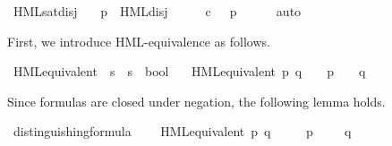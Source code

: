 \begin{isabellebody}
%
\isadelimproof
\isanewline
%
\endisadelimproof
{}\isamarkupfalse%
\ HML{\isacharunderscore}{\kern0pt}sat{\isacharunderscore}{\kern0pt}disj{\isacharcolon}{\kern0pt}\isanewline
\ \ \ {\isacartoucheopen}{\isacharparenleft}{\kern0pt}p\ {\isasymTurnstile}\ HML{\isacharunderscore}{\kern0pt}disj\ {\isasymPhi}{\isacharparenright}{\kern0pt}\ {\isacharequal}{\kern0pt}\ {\isacharparenleft}{\kern0pt}{\isasymexists}\ {\isasymphi}{\isachardot}{\kern0pt}\ {\isasymphi}\ {\isasymin}\isactrlsub c\ {\isasymPhi}\ {\isasymand}\ p\ {\isasymTurnstile}\ {\isasymphi}{\isacharparenright}{\kern0pt}{\isacartoucheclose}\isanewline
%
\isadelimproof
\ \ %
\endisadelimproof
%
\isatagproof
{}\isamarkupfalse%
\ auto%
\endisatagproof
{\isafoldproof}%
%
\isadelimproof
%
\endisadelimproof
%
\isadelimdocument
%
\endisadelimdocument
%
\isatagdocument
%
\isamarkuptrue%
%
\endisatagdocument
{\isafolddocument}%
%
\isadelimdocument
%
\endisadelimdocument
%
\begin{isamarkuptext}%
First, we introduce HML-equivalence as follows.%
\end{isamarkuptext}\isamarkuptrue%
\isamarkupfalse%
\ HML{\isacharunderscore}{\kern0pt}equivalent\ {\isacharcolon}{\kern0pt}{\isacharcolon}{\kern0pt}\ {\isacartoucheopen}{\isacharprime}{\kern0pt}s\ {\isasymRightarrow}\ {\isacharprime}{\kern0pt}s\ {\isasymRightarrow}\ bool{\isacartoucheclose}\isanewline
\ \ \ {\isacartoucheopen}HML{\isacharunderscore}{\kern0pt}equivalent\ p\ q\ {\isasymequiv}\ {\isacharparenleft}{\kern0pt}{\isasymforall}\ {\isasymphi}{\isachardot}{\kern0pt}\ {\isacharparenleft}{\kern0pt}p\ {\isasymTurnstile}\ {\isasymphi}{\isacharparenright}{\kern0pt}\ {\isasymlongleftrightarrow}\ {\isacharparenleft}{\kern0pt}q\ {\isasymTurnstile}\ {\isasymphi}{\isacharparenright}{\kern0pt}{\isacharparenright}{\kern0pt}{\isacartoucheclose}%
\begin{isamarkuptext}%
Since formulas are closed under negation, the following lemma holds.%
\end{isamarkuptext}\isamarkuptrue%
\isamarkupfalse%
\ distinguishing{\isacharunderscore}{\kern0pt}formula{\isacharcolon}{\kern0pt}\isanewline
\ \ \ {\isacartoucheopen}{\isasymnot}\ HML{\isacharunderscore}{\kern0pt}equivalent\ p\ q{\isacartoucheclose}\isanewline
\ \ \ {\isacartoucheopen}{\isasymexists}\ {\isasymphi}{\isachardot}{\kern0pt}\ p\ {\isasymTurnstile}\ {\isasymphi}\ {\isasymand}\ {\isasymnot}\ q\ {\isasymTurnstile}\ {\isasymphi}{\isacartoucheclose}\isanewline

\end{isabellebody}
